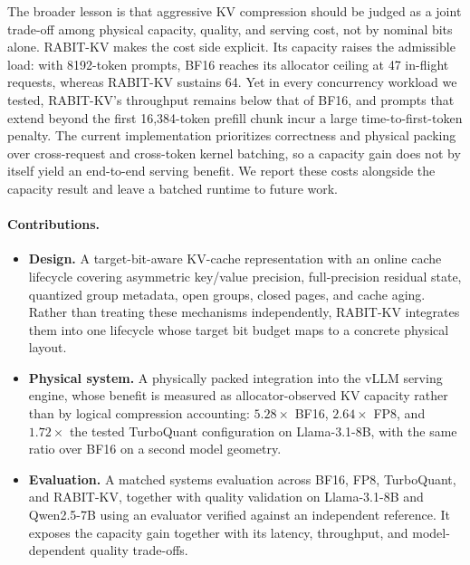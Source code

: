\documentclass{article}
\begin{document}
The broader lesson is that aggressive KV compression should be judged as a joint trade-off among
physical capacity, quality, and serving cost, not by nominal bits alone. RABIT-KV makes the cost side
explicit. Its capacity raises the admissible load: with 8192-token prompts, BF16 reaches its allocator
ceiling at 47 in-flight requests, whereas RABIT-KV sustains 64. Yet in every concurrency workload we
tested, RABIT-KV's throughput remains below that of BF16, and prompts that extend beyond the first
16,384-token prefill chunk incur a large time-to-first-token penalty. The current implementation
prioritizes correctness and physical packing over cross-request and cross-token kernel batching, so a
capacity gain does not by itself yield an end-to-end serving benefit. We report these costs alongside
the capacity result and leave a batched runtime to future work.

\paragraph{Contributions.}
\vspace{-0.6\baselineskip}
\begin{itemize}
\item \textbf{Design.} A target-bit-aware KV-cache representation with an online cache lifecycle
  covering asymmetric key/value precision, full-precision residual state, quantized group metadata,
  open groups, closed pages, and cache aging. Rather than treating these mechanisms independently,
  RABIT-KV integrates them into one lifecycle whose target bit budget maps to a concrete physical
  layout.
\item \textbf{Physical system.} A physically packed integration into the vLLM serving engine, whose
  benefit is measured as allocator-observed KV capacity rather than by logical compression accounting:
  $5.28\times$ BF16, $2.64\times$ FP8, and $1.72\times$ the tested TurboQuant configuration on
  Llama-3.1-8B, with the same ratio over BF16 on a second model geometry.
\item \textbf{Evaluation.} A matched systems evaluation across BF16, FP8, TurboQuant, and RABIT-KV,
  together with quality validation on Llama-3.1-8B and Qwen2.5-7B using an evaluator verified against
  an independent reference. It exposes the capacity gain together with its latency, throughput, and
  model-dependent quality trade-offs.
\end{itemize}
\end{document}
